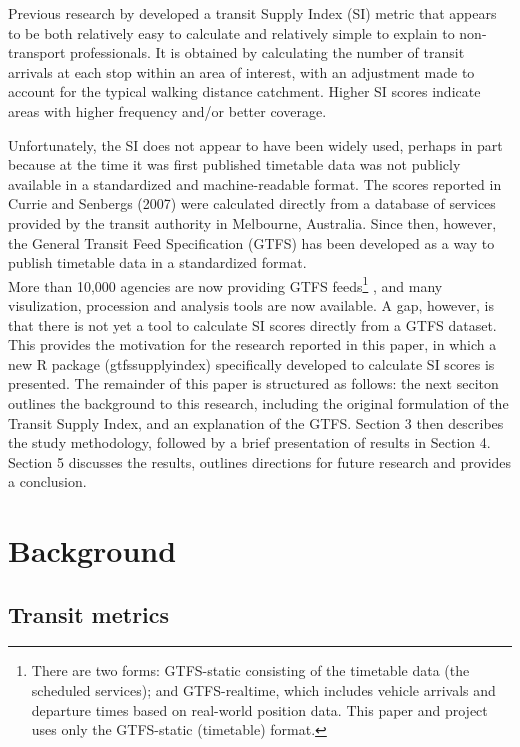 \documentclass[preprint, 3p,
authoryear]{elsarticle} %
\begin{document}
Previous research by \citet{currie2007identifying} developed a transit
Supply Index (SI) metric that appears to be both relatively easy to
calculate and relatively simple to explain to non-transport
professionals. It is obtained by calculating the number of transit
arrivals at each stop within an area of interest, with an adjustment
made to account for the typical walking distance catchment. Higher SI
scores indicate areas with higher frequency and/or better coverage.

Unfortunately, the SI does not appear to have been widely used, perhaps
in part because at the time it was first published timetable data was
not publicly available in a standardized and machine-readable format.
The scores reported in Currie and Senbergs (2007) were calculated
directly from a database of services provided by the transit authority
in Melbourne, Australia. Since then, however, the General Transit Feed
Specification (GTFS) has been developed as a way to publish timetable
data in a standardized format.\\
More than 10,000 agencies are now providing GTFS feeds\footnote{There
  are two forms: GTFS-static consisting of the timetable data (the
  scheduled services); and GTFS-realtime, which includes vehicle
  arrivals and departure times based on real-world position data. This
  paper and project uses only the GTFS-static (timetable) format.}
\citep{GTFS}, and many visulization, procession and analysis tools are
now available. A gap, however, is that there is not yet a tool to
calculate SI scores directly from a GTFS dataset. This provides the
motivation for the research reported in this paper, in which a new R
package (gtfssupplyindex) specifically developed to calculate SI scores
is presented. The remainder of this paper is structured as follows: the
next seciton outlines the background to this research, including the
original formulation of the Transit Supply Index, and an explanation of
the GTFS. Section 3 then describes the study methodology, followed by a
brief presentation of results in Section 4. Section 5 discusses the
results, outlines directions for future research and provides a
conclusion.

\hypertarget{background}{%
\section{Background}\label{background}}

\hypertarget{transit-metrics}{%
\subsection{Transit metrics}\label{transit-metrics}}
\end{document}
